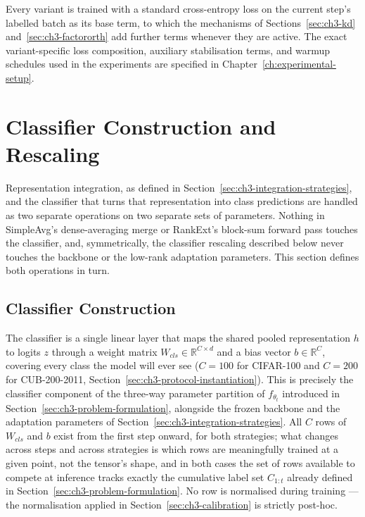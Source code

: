 Every variant is trained with a standard cross-entropy loss on the current
step's labelled batch as its base term, to which the mechanisms of
Sections~\ref{sec:ch3-kd} and~\ref{sec:ch3-factororth} add further terms
whenever they are active. The exact variant-specific loss composition,
auxiliary stabilisation terms, and warmup schedules used in the experiments
are specified in Chapter~\ref{ch:experimental-setup}.

\section{Classifier Construction and Rescaling}
\label{sec:ch3-classifier-calibration}

Representation integration, as defined in Section~\ref{sec:ch3-integration-strategies}, and the classifier
that turns that representation into class predictions are handled as two
separate operations on two separate sets of parameters. Nothing in
SimpleAvg's dense-averaging merge or RankExt's block-sum forward pass
touches the classifier, and, symmetrically, the classifier rescaling
described below never touches the backbone or the low-rank adaptation
parameters. This section defines both operations in turn.

\subsection{Classifier Construction}
\label{sec:ch3-classifier-construction}

The classifier is a single linear layer that maps the shared pooled
representation $h$ to logits $z$ through a weight matrix
$W_{cls}\in\mathbb{R}^{C\times d}$ and a bias vector $b\in\mathbb{R}^{C}$,
covering every class the model will ever see ($C=100$ for CIFAR-100 and
$C=200$ for CUB-200-2011, Section~\ref{sec:ch3-protocol-instantiation}). This is precisely the classifier component of the three-way
parameter partition of $f_{\theta_t}$ introduced in Section~\ref{sec:ch3-problem-formulation}, alongside
the frozen backbone and the adaptation parameters of Section~\ref{sec:ch3-integration-strategies}. All $C$
rows of $W_{cls}$ and $b$ exist from the
first step onward, for both strategies; what changes across steps and
across strategies is which rows are meaningfully trained at a given point,
not the tensor's shape, and in both cases the set of rows available to
compete at inference tracks exactly the cumulative label set $C_{1:t}$
already defined in Section~\ref{sec:ch3-problem-formulation}. No row is normalised during training --- the
normalisation applied in Section~\ref{sec:ch3-calibration} is strictly post-hoc.

